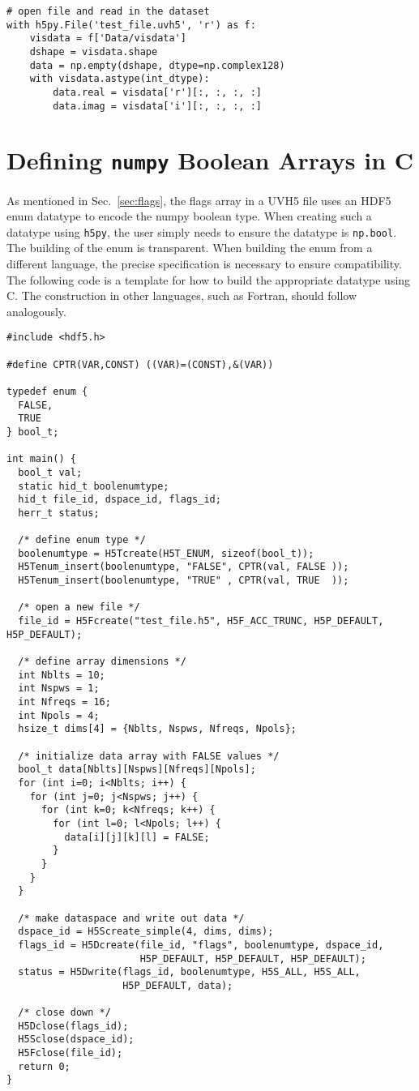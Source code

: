 \documentclass[11pt, oneside]{article}
\begin{document}
\begin{appendices}
\begin{verbatim}
# open file and read in the dataset
with h5py.File('test_file.uvh5', 'r') as f:
    visdata = f['Data/visdata']
    dshape = visdata.shape
    data = np.empty(dshape, dtype=np.complex128)
    with visdata.astype(int_dtype):
        data.real = visdata['r'][:, :, :, :]
        data.imag = visdata['i'][:, :, :, :]
\end{verbatim}


\section{Defining \texttt{numpy} Boolean Arrays in C}
\label{appendix:boolean}
As mentioned in Sec.~\ref{sec:flags}, the flags array in a UVH5 file uses an
HDF5 enum datatype to encode the numpy boolean type. When creating such a
datatype using \verb+h5py+, the user simply needs to ensure the datatype is
\verb+np.bool+. The building of the enum is transparent. When building the enum
from a different language, the precise specification is necessary to ensure
compatibility. The following code is a template for how to build the appropriate
datatype using C. The construction in other languages, such as Fortran, should
follow analogously.
\begin{verbatim}
#include <hdf5.h>

#define CPTR(VAR,CONST) ((VAR)=(CONST),&(VAR))

typedef enum {
  FALSE,
  TRUE
} bool_t;

int main() {
  bool_t val;
  static hid_t boolenumtype;
  hid_t file_id, dspace_id, flags_id;
  herr_t status;

  /* define enum type */
  boolenumtype = H5Tcreate(H5T_ENUM, sizeof(bool_t));
  H5Tenum_insert(boolenumtype, "FALSE", CPTR(val, FALSE ));
  H5Tenum_insert(boolenumtype, "TRUE" , CPTR(val, TRUE  ));

  /* open a new file */
  file_id = H5Fcreate("test_file.h5", H5F_ACC_TRUNC, H5P_DEFAULT, H5P_DEFAULT);

  /* define array dimensions */
  int Nblts = 10;
  int Nspws = 1;
  int Nfreqs = 16;
  int Npols = 4;
  hsize_t dims[4] = {Nblts, Nspws, Nfreqs, Npols};

  /* initialize data array with FALSE values */
  bool_t data[Nblts][Nspws][Nfreqs][Npols];
  for (int i=0; i<Nblts; i++) {
    for (int j=0; j<Nspws; j++) {
      for (int k=0; k<Nfreqs; k++) {
        for (int l=0; l<Npols; l++) {
          data[i][j][k][l] = FALSE;
        }
      }
    }
  }

  /* make dataspace and write out data */
  dspace_id = H5Screate_simple(4, dims, dims);
  flags_id = H5Dcreate(file_id, "flags", boolenumtype, dspace_id,
                       H5P_DEFAULT, H5P_DEFAULT, H5P_DEFAULT);
  status = H5Dwrite(flags_id, boolenumtype, H5S_ALL, H5S_ALL,
                    H5P_DEFAULT, data);

  /* close down */
  H5Dclose(flags_id);
  H5Sclose(dspace_id);
  H5Fclose(file_id);
  return 0;
}
\end{verbatim}


\end{appendices}
\end{document}

